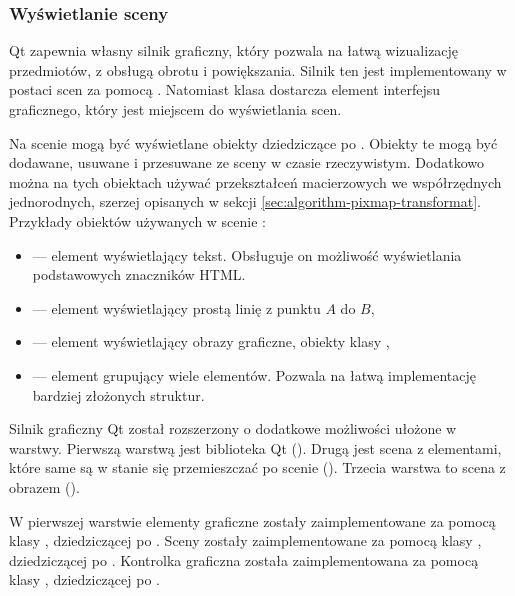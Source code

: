 \subsubsection{Wyświetlanie sceny}
\par
Qt zapewnia własny silnik graficzny, który pozwala na łatwą wizualizację przedmiotów, z obsługą obrotu i powiększania.
Silnik ten jest implementowany w postaci scen za pomocą .
Natomiast klasa  dostarcza element interfejsu graficznego, który jest miejscem do wyświetlania scen.
\par
Na scenie mogą być wyświetlane obiekty dziedziczące po .
Obiekty te mogą być dodawane, usuwane i przesuwane ze sceny w czasie rzeczywistym.
Dodatkowo można na tych obiektach używać przekształceń macierzowych we współrzędnych jednorodnych, szerzej opisanych w sekcji \ref{sec:algorithm-pixmap-transformat}.
Przykłady obiektów używanych w scenie :
\begin{itemize}
    \item {} --- element wyświetlający tekst.
          Obsługuje on możliwość wyświetlania podstawowych znaczników HTML.
    \item {} --- element wyświetlający prostą linię z punktu $A$ do $B$,
    \item {} --- element wyświetlający obrazy graficzne, obiekty klasy ,
    \item {} --- element grupujący wiele elementów.
          Pozwala na łatwą implementację bardziej złożonych struktur.
\end{itemize}
\par
Silnik graficzny Qt został rozszerzony o dodatkowe możliwości ułożone w warstwy.
Pierwszą warstwą jest biblioteka Qt ().
Drugą jest scena z elementami, które same są w stanie się przemieszczać po scenie ().
Trzecia warstwa to scena z obrazem \DICOM ().
\par
W pierwszej warstwie elementy graficzne zostały zaimplementowane za pomocą klasy , dziedziczącej po .
Sceny zostały zaimplementowane za pomocą klasy , dziedziczącej po .
Kontrolka graficzna została zaimplementowana za pomocą klasy , dziedziczącej po .
\par
